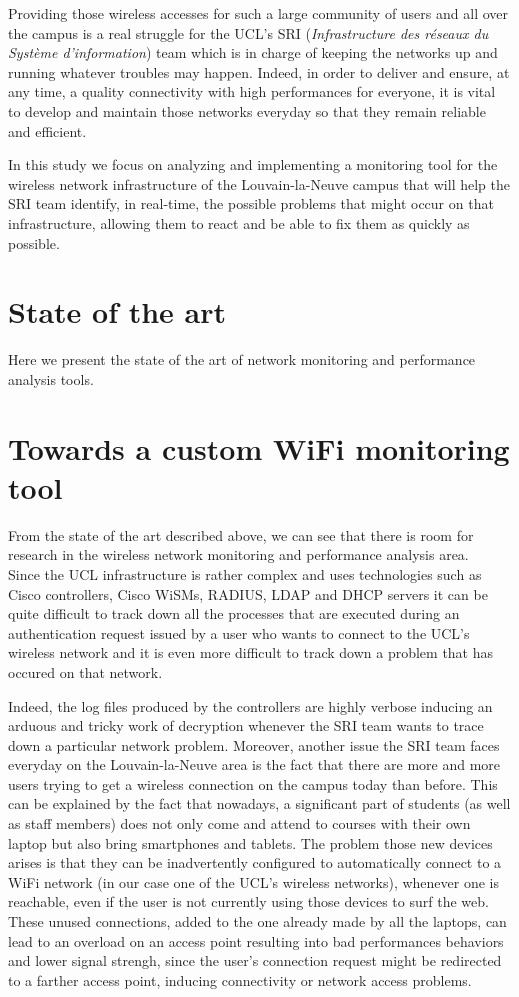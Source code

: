 Providing those wireless accesses for such a large community of users and all over the campus is a real struggle for the UCL's SRI (\textit{Infrastructure des réseaux du Système d'information}) team which is in charge of keeping the networks up and running whatever troubles may happen. Indeed, in order to deliver and ensure, at any time, a quality connectivity with high performances for everyone, it is vital to develop and maintain those networks everyday so that they remain reliable and efficient.
 
In this study we focus on analyzing and implementing a monitoring tool for the wireless network infrastructure of the Louvain-la-Neuve campus that will help the SRI team identify, in real-time, the possible problems that might occur on that infrastructure, allowing them to react and be able to fix them as quickly as possible.


\section{State of the art}
Here we present the state of the art of network monitoring and performance analysis tools.\\



\section{Towards a custom WiFi monitoring tool}
From the state of the art described above, we can see that there is room for research in the wireless network monitoring and performance analysis area.\\
Since the UCL infrastructure is rather complex and uses technologies such as Cisco controllers, Cisco WiSMs, RADIUS, LDAP and DHCP servers it can be quite difficult to track down all the processes that are executed during an authentication request issued by a user who wants to connect to the UCL's wireless network and it is even more difficult to track down a problem that has occured on that network.

Indeed, the log files produced by the controllers are highly verbose inducing an arduous and tricky work of decryption whenever the SRI team wants to trace down a particular network problem. Moreover, another issue the SRI team faces everyday on the Louvain-la-Neuve area is the fact that there are more and more users trying to get a wireless connection on the campus today than before. This can be explained by the fact that nowadays, a significant part of students (as well as staff members) does not only come and attend to courses with their own laptop but also bring smartphones and tablets. The problem those new devices arises is that they can be inadvertently configured to automatically connect to a WiFi network (in our case one of the UCL's wireless networks), whenever one is reachable, even if the user is not currently using those devices to surf the web. These unused connections, added to the one already made by all the laptops, can lead to an overload on an access point resulting into bad performances behaviors and lower signal strengh, since the user's connection request might be redirected to a farther access point, inducing connectivity or network access problems.

